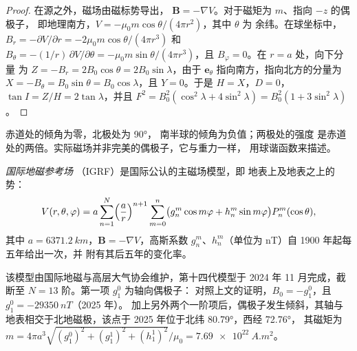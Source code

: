 \begin{proof}
在源之外，磁场由磁标势导出，
$\mathbf B = -\nabla V$。对于磁矩为 $m$、指向 $-z$ 的偶极子，
即地理南方，$V = -\mu_0 m\cos\theta/(4\pi r^2)$，其中 $\theta$ 为
余纬。在球坐标中，$B_r = -\partial V/\partial r =
-2\mu_0 m\cos\theta/(4\pi r^3)$ 和 $B_\theta = -(1/r)\,\partial V/\partial\theta =
-\mu_0 m\sin\theta/(4\pi r^3)$，且 $B_\varphi = 0$。在 $r = a$ 处，向下分量
为 $Z = -B_r = 2B_0\cos\theta = 2B_0\sin\lambda$，由于
$\mathbf e_\theta$ 指向南方，指向北方的分量为 $X = -B_\theta =
B_0\sin\theta = B_0\cos\lambda$，且 $Y = 0$。于是 $H = X$，$D = 0$，$\tan I =
Z/H = 2\tan\lambda$，并且 $F^2 = B_0^2(\cos^2\lambda + 4\sin^2\lambda) =
B_0^2(1 + 3\sin^2\lambda)$。
\end{proof}

赤道处的倾角为零，北极处为 \ang{90}，
南半球的倾角为负值；两极处的强度
是赤道处的两倍。实际磁场并非完美的偶极子，它与重力一样，
用球谐函数来描述。

\begin{definition}[国际地磁参考场]\label{def:b3:palaeomagnetism:igrf}
\emph{国际地磁参考场}
（IGRF）是国际公认的主磁场模型，即
地表上及地表之上的势：
\[
  V(r,\theta,\varphi) = a\sum_{n=1}^{N}\Bigl(\frac ar\Bigr)^{n+1}\sum_{m=0}^{n}
  \bigl(g_n^m\cos m\varphi + h_n^m\sin m\varphi\bigr)P_n^m(\cos\theta),
\]
其中 $a = \qty{6371.2}{km}$，$\mathbf B = -\nabla V$，高斯系数
$g_n^m$、$h_n^m$（单位为 \unit{nT}）自 1900 年起每五年给出一次，并
附有其后五年的变化率。
\end{definition}

该模型由国际地磁与高层大气协会维护，第十四代模型于
2024 年 11 月完成，截断至
$N = 13$ 阶。第一项 $g_1^0$ 为轴向偶极子：
对照上文的证明，$B_0 = -g_1^0$，且 $g_1^0 = \qty{-29350}{nT}$（2025 年）。
加上另外两个一阶项后，偶极子发生倾斜，其轴与
地表相交于北地磁极，该点于 2025 年位于北纬 \ang{80.79}，西经 \ang{72.76}，
其磁矩为 $m = 4\pi a^3\sqrt{(g_1^0)^2 + (g_1^1)^2 +
(h_1^1)^2}/\mu_0 = \qty{7.69e22}{A.m^2}$。

